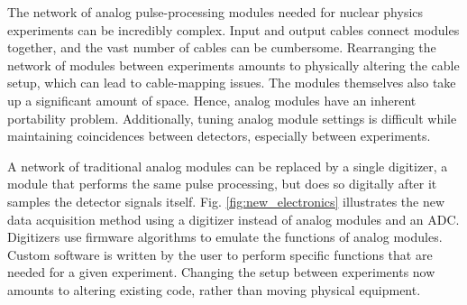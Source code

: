 The network of analog pulse-processing modules needed for nuclear physics experiments can be incredibly complex. Input and output cables connect modules together, and the vast number of cables can be cumbersome. Rearranging the network of modules between experiments amounts to physically altering the cable setup, which can lead to cable-mapping issues. The modules themselves also take up a significant amount of space. Hence, analog modules have an inherent portability problem. Additionally, tuning analog module settings is difficult while maintaining coincidences between detectors, especially between experiments.

A network of traditional analog modules can be replaced by a single digitizer, a module that performs the same pulse processing, but does so digitally after it samples the detector signals itself. Fig. \ref{fig:new_electronics} illustrates the new data acquisition method using a digitizer instead of analog modules and an ADC. Digitizers use firmware algorithms to emulate the functions of analog modules. Custom software is written by the user to perform specific functions that are needed for a given experiment. Changing the setup between experiments now amounts to altering existing code, rather than moving physical equipment. 

